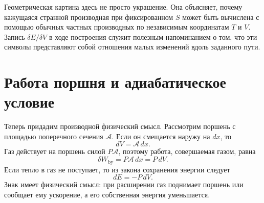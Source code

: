 Геометрическая картина здесь не просто украшение. Она объясняет, почему кажущаяся странной производная при фиксированном \(S\) может быть вычислена с помощью обычных частных производных по независимым координатам \(T\) и \(V\). Запись \(\delta E/\delta V\) в ходе построения служит полезным напоминанием о том, что эти символы представляют собой отношения малых изменений вдоль заданного пути.

\begin{classroomqa}
\end{classroomqa}

\begin{classroomqa}
\end{classroomqa}

\section{Работа поршня и адиабатическое условие}

Теперь придадим производной физический смысл. Рассмотрим поршень с
площадью поперечного сечения \(\mathcal A\). Если он смещается наружу на \(dx\), то
\begin{equation}
 dV=\mathcal A\,dx.
 \label{eq:sm5-piston-volume}
\end{equation}
Газ действует на поршень силой \(P\mathcal A\), поэтому работа,
совершаемая газом, равна
\begin{equation}
 \delta W_{\mathrm{by}}=P\mathcal A\,dx=P\,dV.
 \label{eq:sm5-piston-work}
\end{equation}
Если тепло в газ не поступает, то из закона сохранения энергии следует
\begin{equation}
 dE=-P\,dV.
 \label{eq:sm5-adiabatic-work}
\end{equation}
Знак имеет физический смысл: при расширении газ поднимает поршень или сообщает ему ускорение, а его собственная энергия уменьшается.

